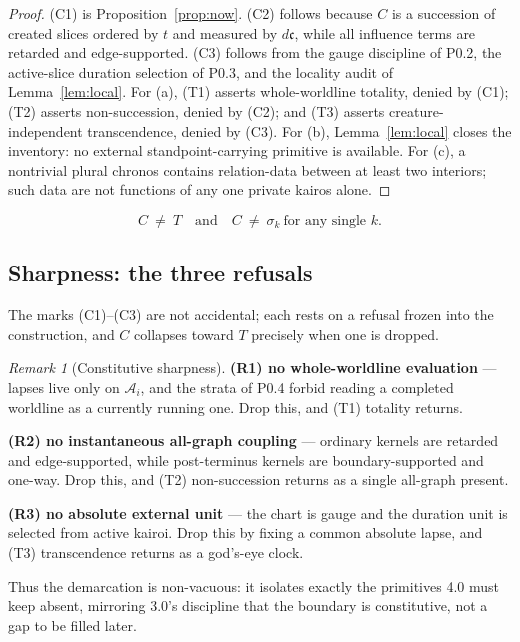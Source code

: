 \documentclass[11pt,a4paper]{article}
\theoremstyle{definition}
\theoremstyle{plain}
\theoremstyle{remark}
\newtheorem{remark}[definition]{Remark}
\begin{document}
\begin{proof}
(C1) is Proposition~\ref{prop:now}. (C2) follows because \(C\) is a succession of created
slices ordered by \(t\) and measured by \(d\mathfrak c\), while all influence terms are
retarded and edge-supported. (C3) follows from the gauge discipline of P0.2, the
active-slice duration selection of P0.3, and the locality audit of Lemma~\ref{lem:local}.
For (a), (T1) asserts whole-worldline totality, denied by (C1); (T2) asserts
non-succession, denied by (C2); and (T3) asserts creature-independent transcendence,
denied by (C3). For (b), Lemma~\ref{lem:local} closes the inventory: no external
standpoint-carrying primitive is available. For (c), a nontrivial plural chronos contains
relation-data between at least two interiors; such data are not functions of any one
private kairos alone. \qedhere
\end{proof}

\[
\boxed{\,C\ \neq\ T\quad\text{and}\quad C\ \neq\ \sigma_k\ \text{for any single }k.\,}
\]

\subsection{Sharpness: the three refusals}

The marks (C1)--(C3) are not accidental; each rests on a refusal frozen into the
construction, and \(C\) collapses toward \(T\) precisely when one is dropped.

\begin{remark}[Constitutive sharpness]\label{rem:sharp}
\textbf{(R1) no whole-worldline evaluation} --- lapses live only on \(\mathcal A_i\), and
the strata of P0.4 forbid reading a completed worldline as a currently running one. Drop
this, and (T1) totality returns.

\textbf{(R2) no instantaneous all-graph coupling} --- ordinary kernels are retarded and
edge-supported, while post-terminus kernels are boundary-supported and one-way. Drop
this, and (T2) non-succession returns as a single all-graph present.

\textbf{(R3) no absolute external unit} --- the chart is gauge and the duration unit is
selected from active kairoi. Drop this by fixing a common absolute lapse, and (T3)
transcendence returns as a god's-eye clock.

Thus the demarcation is non-vacuous: it isolates exactly the primitives 4.0 must keep
absent, mirroring 3.0's discipline that the boundary is constitutive, not a gap to be
filled later.
\end{remark}
\end{document}
